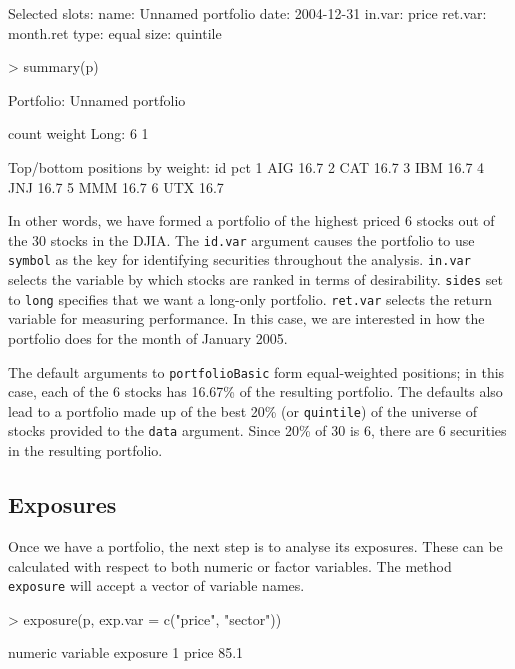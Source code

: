 \documentclass[a4paper]{report}
\begin{document}
\begin{article}
\begin{Schunk}
\begin{Soutput}
Selected slots:
name: Unnamed portfolio
date: 2004-12-31
in.var: price
ret.var: month.ret
type: equal
size: quintile
\end{Soutput}
\begin{Sinput}
> summary(p)
\end{Sinput}
\begin{Soutput}
Portfolio: Unnamed portfolio

        count       weight
Long:       6            1 

Top/bottom positions by weight:
   id  pct
1 AIG 16.7
2 CAT 16.7
3 IBM 16.7
4 JNJ 16.7
5 MMM 16.7
6 UTX 16.7
\end{Soutput}
\end{Schunk}

In other words, we have formed a portfolio of the highest priced 6
stocks out of the 30 stocks in the DJIA. The \texttt{id.var} argument
causes the portfolio to use \texttt{symbol} as the key for identifying
securities throughout the analysis. \texttt{in.var} selects the
variable by which stocks are ranked in terms of desirability.
\texttt{sides} set to \texttt{long} specifies that we want a long-only
portfolio. \texttt{ret.var} selects the return variable for measuring
performance. In this case, we are interested in how the portfolio does
for the month of January 2005.

The default arguments to \texttt{portfolioBasic} form equal-weighted
positions; in this case, each of the 6 stocks has 16.67\% of the
resulting portfolio. The defaults also lead to a portfolio made up of
the best 20\% (or \texttt{quintile}) of the universe of stocks
provided to the \texttt{data} argument. Since 20\% of 30 is 6, there
are 6 securities in the resulting portfolio.


\subsection*{Exposures}

Once we have a portfolio, the next step is to analyse its exposures.
These can be calculated with respect to both numeric or factor
variables.  The method \texttt{exposure} will accept a vector of
variable names.

\begin{Schunk}
\begin{Sinput}
> exposure(p, exp.var = c("price", "sector"))
\end{Sinput}
\begin{Soutput}
numeric 
  variable exposure
1    price     85.1


\end{Soutput}
\end{Schunk}
\end{article}
\end{document}

